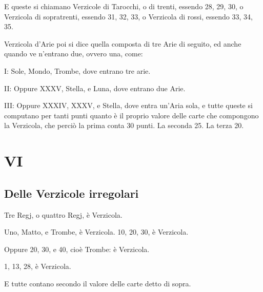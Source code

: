 \documentclass[11pt,a6paper]{article}
\begin{document}
E queste si chiamano Verzicole di Tarocchi, o di trenti, essendo 28, 29, 30, o Verzicola di sopratrenti, essendo 31, 32, 33, o Verzicola di rossi, essendo 33, 34, 35.

Verzicola d'Arie poi si dice quella composta di tre Arie di seguito, ed anche quando ve n'entrano due, ovvero una, come:

I: Sole, Mondo, Trombe, dove entrano tre arie.

II: Oppure XXXV, Stella, e Luna, dove entrano due Arie.

III: Oppure XXXIV, XXXV, e Stella, dove entra un'Aria sola, e tutte queste si computano per tanti punti quanto è il proprio valore delle carte che compongono la Verzicola, che perciò la prima conta 30 punti.
La seconda 25. 
La terza 20.

\section{VI}
\subsection*{Delle Verzicole irregolari}

Tre Regj, o quattro Regj, è Verzicola.

Uno, Matto, e Trombe, è Verzicola. 10, 20, 30, è Verzicola.

Oppure 20, 30, e 40, cioè Trombe: è Verzicola.

1, 13, 28, è Verzicola.

E tutte contano secondo il valore delle carte detto di sopra.
\vspace{10pt}
\end{document}
